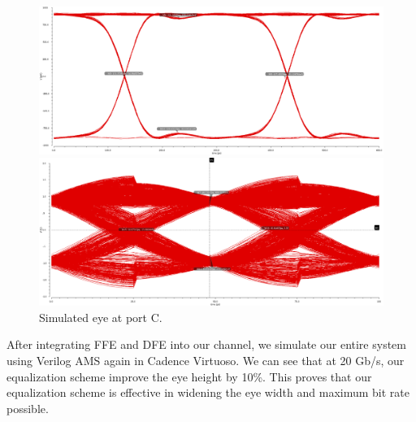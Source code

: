 \documentclass{book}  %
\renewcommand{\section}[1]{\psection{#1}}
\begin{document}
\begin{paper}
\begin{figure}[htbp!]
	\captionsetup[subfigure]{justification=centering}
	\begin{minipage}[tb]{0.5\textwidth}
		\centering	
		\includegraphics[width=\textwidth]{./img/channel_response_eye_diagram/3gbp_eye_total.png}
	\end{minipage}%
	\begin{minipage}[tb]{0.5\textwidth}
		\centering	
		\includegraphics[width=\textwidth]{./img/channel_response_eye_diagram/20gbp_eye_total.png}
	\end{minipage}%
	\label{fig:eye_total_port_C}
	\caption{Simulated eye at port C. }
\end{figure}

\section{Result}


After integrating FFE and DFE into our channel, we simulate our entire system using Verilog AMS again in Cadence Virtuoso. We can see that at 20 Gb/s, our equalization scheme improve the eye height by 10\%. This proves that our equalization scheme is effective in widening the eye width and maximum bit rate possible.


\end{paper}
\end{document}
